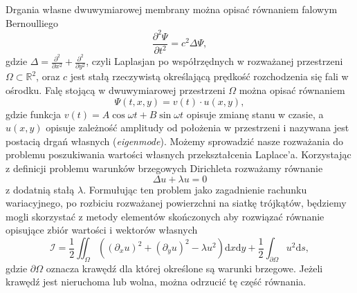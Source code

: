 \documentclass{classrep}
\begin{document}
Drgania własne dwuwymiarowej membrany można opisać równaniem falowym Bernoulliego
\begin{equation}
\frac{\partial^2 \Psi}{\partial t^2} = c^2 \Delta \Psi,
\end{equation}
gdzie $\Delta = \frac{\partial^2}{\partial x^2} + \frac{\partial^2}{\partial y^2}$, czyli Laplasjan po współrzędnych w rozważanej przestrzeni $\Omega \subset \mathbb{R}^2$, oraz $c$ jest stałą rzeczywistą określającą prędkość rozchodzenia się fali w ośrodku.
Falę stojącą w dwuwymiarowej przestrzeni $\Omega$ można opisać równaniem
\begin{equation}
\Psi(t, x, y) = v(t) \cdot u(x, y),
\end{equation}
gdzie funkcja $v(t) = A\cos{\omega t} + B\sin{\omega t}$ opisuje zmianę stanu w czasie, a $u(x, y)$ opisuje zależność amplitudy od położenia w przestrzeni i nazywana jest postacią drgań własnych (\textit{eigenmode}).
Możemy sprowadzić nasze rozważania do problemu poszukiwania wartości własnych przekształcenia Laplace'a. Korzystając z definicji problemu warunków brzegowych Dirichleta rozważamy równanie 
\begin{equation}
\Delta u +\lambda u=0
\end{equation}
z dodatnią stałą $\lambda$. %
Formułując ten problem jako zagadnienie rachunku wariacyjnego, po rozbiciu rozważanej powierzchni na siatkę trójkątów, będziemy mogli skorzystać z metody elementów skończonych aby rozwiązać równanie opisujące zbiór wartości i wektorów własnych 
\begin{equation} \label{big_integral}
\mathcal{I} = \frac{1}{2}\iint_\Omega \left(\left(\partial_x u\right)^2+\left(\partial_y u\right)^2-\lambda u^2\right)\mathrm{d}x\mathrm{d}y+\frac{1}{2}\int_{\partial \Omega} u^2\mathrm{d}s,
\end{equation}
gdzie $\partial\Omega$ oznacza krawędź dla której określone są warunki brzegowe. Jeżeli krawędź jest nieruchoma lub wolna, można odrzucić tę część równania.
\end{document}
